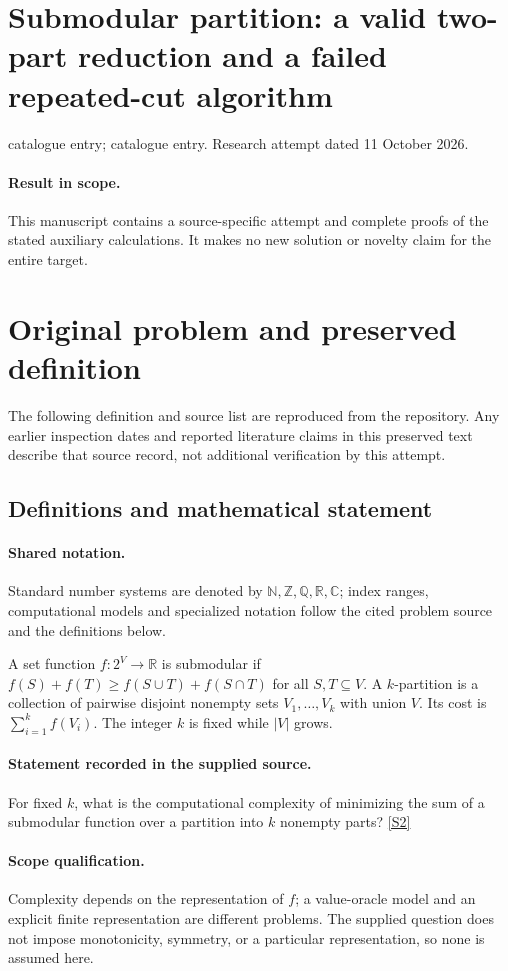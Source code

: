 \documentclass[11pt]{article}
\begin{document}
\section*{Submodular partition: a valid two-part reduction and a failed repeated-cut algorithm}
\noindent catalogue entry; catalogue entry. Research attempt dated 11 October 2026.
\paragraph{Result in scope.}This manuscript contains a source-specific attempt and complete proofs of the stated auxiliary calculations. It makes no new solution or novelty claim for the entire target.
\section{Original problem and preserved definition}
The following definition and source list are reproduced from the repository. Any earlier inspection dates and reported literature claims in this preserved text describe that source record, not additional verification by this attempt.
\subsection{Definitions and mathematical statement}

\paragraph{Shared notation.}Standard number systems are denoted by $\mathbb N,\mathbb Z,\mathbb Q,\mathbb R,\mathbb C$; index ranges, computational models and specialized notation follow the cited problem source and the definitions below.


A set function $f:2^V\to\mathbb R$ is submodular if $f(S)+f(T)\geq f(S\cup T)+f(S\cap T)$ for all $S,T\subseteq V$. A $k$-partition is a collection of pairwise disjoint nonempty sets $V_1,\ldots,V_k$ with union $V$. Its cost is $\sum_{i=1}^kf(V_i)$. The integer $k$ is fixed while $|V|$ grows.
\paragraph{Statement recorded in the supplied source.}
For fixed $k$, what is the computational complexity of minimizing the sum of a submodular function over a partition into $k$ nonempty parts? \href{https://doi.org/10.4171/owr/2021/53}{[S2]}
\paragraph{Scope qualification.}
Complexity depends on the representation of $f$; a value-oracle model and an explicit finite representation are different problems. The supplied question does not impose monotonicity, symmetry, or a particular representation, so none is assumed here.
\end{document}
